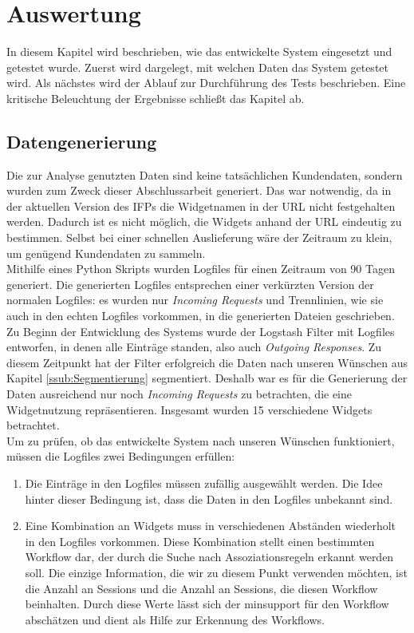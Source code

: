 \section{Auswertung}
\label{sec:Auswertung}
In diesem Kapitel wird beschrieben, wie das entwickelte System eingesetzt und getestet wurde. Zuerst wird dargelegt, mit welchen Daten das System getestet wird. Als nächstes wird der Ablauf zur Durchführung des Tests beschrieben. Eine kritische Beleuchtung der Ergebnisse schließt das Kapitel ab.
\subsection{Datengenerierung}
\label{sub:Datengenerierung}

Die zur Analyse genutzten Daten sind keine tatsächlichen Kundendaten, sondern wurden zum Zweck dieser Abschlussarbeit generiert. Das war notwendig, da in der aktuellen Version des IFPs die Widgetnamen in der URL nicht festgehalten werden. Dadurch ist es nicht möglich, die Widgets anhand der URL eindeutig zu bestimmen. Selbst bei einer schnellen Auslieferung wäre der Zeitraum zu klein, um genügend Kundendaten zu sammeln.\\
Mithilfe eines Python Skripts wurden Logfiles für einen Zeitraum von 90 Tagen generiert. Die generierten Logfiles entsprechen einer verkürzten Version der normalen Logfiles: es wurden nur \textit{Incoming Requests} und Trennlinien, wie sie auch in den echten Logfiles vorkommen, in die generierten Dateien geschrieben. Zu Beginn der Entwicklung des Systems wurde der Logstash Filter mit Logfiles entworfen, in denen alle Einträge standen, also auch \textit{Outgoing Responses}. Zu diesem Zeitpunkt hat der Filter erfolgreich die Daten nach unseren Wünschen aus Kapitel \ref{ssub:Segmentierung} segmentiert. Deshalb war es für die Generierung der Daten ausreichend nur noch \textit{Incoming Requests} zu betrachten, die eine Widgetnutzung repräsentieren. Insgesamt wurden 15 verschiedene Widgets betrachtet.\\
Um zu prüfen, ob das entwickelte System nach unseren Wünschen funktioniert, müssen die Logfiles zwei Bedingungen erfüllen:\\
\begin{enumerate}
	\item Die Einträge in den Logfiles müssen zufällig ausgewählt werden. Die Idee hinter dieser Bedingung ist, dass die Daten in den Logfiles unbekannt sind.\\
	\item Eine Kombination an Widgets muss in verschiedenen Abständen wiederholt in den Logfiles vorkommen. Diese Kombination stellt einen bestimmten Workflow dar, der durch die Suche nach Assoziationsregeln erkannt werden soll. Die einzige Information, die wir zu diesem Punkt verwenden möchten, ist die Anzahl an Sessions und die Anzahl an Sessions, die diesen Workflow beinhalten. Durch diese Werte lässt sich der minsupport für den Workflow abschätzen und dient als Hilfe zur Erkennung des Workflows.
\end{enumerate}
